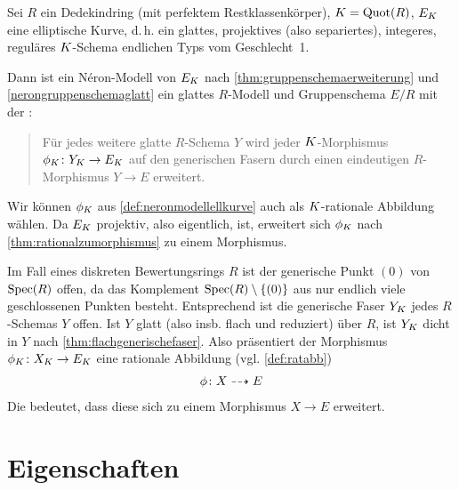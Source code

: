 \documentclass[german]{scrreprt}
\begin{document}

\begin{Bemerkung}
  \label{def:neronmodellellkurve}
  Sei $R$ ein Dedekindring (mit perfektem Restklassenkörper),
  $K=\operatorname{Quot}(R)$, $E_{K}$ eine elliptische Kurve, d.\,h. ein
  glattes, projektives (also separiertes), integeres, reguläres
  $K$-Schema endlichen Typs vom Geschlecht~1.
  
  Dann ist ein Néron-Modell von $E_{K}$ nach
  \ref{thm:gruppenschemaerweiterung} und \ref{nerongruppenschemaglatt}
  ein glattes $R$-Modell und Gruppenschema $E/R$ mit der
  \NAbbEig:
  \begin{quote}
    Für jedes weitere glatte $R$-Schema $Y$ wird jeder
    $K$-Morphismus $\phi_{K}\colon Y_{K}\to E_{K}$ auf den generischen
    Fasern durch einen eindeutigen $R$-Morphismus $Y\to E$ erweitert.
  \end{quote}
\end{Bemerkung}
\begin{Bemerkung}\label{thm:dichtefaser}
  Wir können $\phi_{K}$ aus \ref{def:neronmodellellkurve} auch als
  $K$-rationale Abbildung wählen. Da $E_{K}$ projektiv, also eigentlich,
  ist, erweitert sich $\phi_{K}$ nach
  \ref{thm:rationalzumorphismus} zu einem Morphismus.

  Im Fall eines diskreten Bewertungsrings $R$ ist der generische Punkt
  $(0)$ von $\operatorname{Spec}(R)$ offen, da das Komplement
  $\operatorname{Spec}(R)\setminus\{(0)\}$ aus nur endlich viele geschlossenen
  Punkten besteht. Entsprechend ist die generische Faser $Y_{K}$ jedes
  $R$-Schemas $Y$ offen.
  Ist $Y$ glatt (also insb. flach und reduziert) über $R$, ist $Y_{K}$
  dicht in $Y$ nach \ref{thm:flachgenerischefaser}.
  Also präsentiert der Morphismus $\phi_{K}\colon X_{K}\to E_{K}$ eine
  rationale Abbildung (vgl. \ref{def:ratabb})
  \begin{gather*}
    \phi\colon X\dashrightarrow E
  \end{gather*}
  Die \NAbbEig bedeutet, dass diese sich zu einem Morphismus $X\to E$
  erweitert.
\end{Bemerkung}


\section{Eigenschaften}
\end{document}

